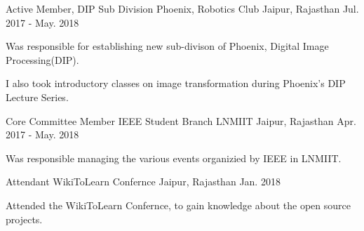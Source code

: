 

\begin{cventries}

  \cventry
    {Active Member, DIP Sub Division} %
    {Phoenix, Robotics Club} %
    {Jaipur, Rajasthan} %
    {Jul. 2017 - May. 2018} %
    {
      \begin{cvitems} %
        \item {Was responsible for establishing new sub-divison of Phoenix, Digital Image Processing(DIP).}
        \item {I also took introductory classes on image transformation during Phoenix's DIP Lecture Series.}
      \end{cvitems}
    }

  \cventry
    {Core Committee Member} %
    {IEEE Student Branch LNMIIT} %
    {Jaipur, Rajasthan} %
    {Apr. 2017 - May. 2018} %
    {
      \begin{cvitems} %
        \item {Was responsible managing the various events organizied by IEEE in LNMIIT.}
      \end{cvitems}
    }
    
      \cventry
    {Attendant} %
    {WikiToLearn Confernce} %
    {Jaipur, Rajasthan} %
    {Jan. 2018} %
    {
      \begin{cvitems} %
        \item {Attended the WikiToLearn Confernce, to gain knowledge about the open source projects.}
      \end{cvitems}
    }

\end{cventries}
